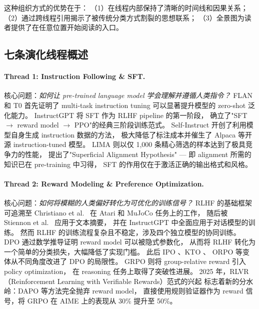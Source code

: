 \noindent
这种组织方式的优势在于：
（1）在线程内部保持了清晰的时间线和因果关系；
（2）通过跨线程引用揭示了被传统分类方式割裂的思想联系；
（3）全景图为读者提供了在任意位置开始阅读的入口。

\subsection{七条演化线程概述}
\label{sec:t0-threads}

\paragraph{Thread 1: Instruction Following \& SFT.}
核心问题：\textit{如何让 pre-trained language model 学会理解并遵循人类指令？}
FLAN \cite{wei2022flan} 和 T0 \cite{sanh2022multitask} 首先证明了
multi-task instruction tuning 可以显著提升模型的 zero-shot 泛化能力。
InstructGPT \cite{ouyang2022instructgpt} 将 SFT 作为 RLHF pipeline 的第一阶段，
确立了"SFT $\rightarrow$ reward model $\rightarrow$ PPO"的经典三阶段训练范式。
Self-Instruct \cite{wang2023selfinstruct} 开创了利用模型自身生成 instruction 数据的方法，
极大降低了标注成本并催生了 Alpaca \cite{taori2023alpaca} 等开源 instruction-tuned 模型。
LIMA \cite{zhou2023lima} 则以仅 1,000 条精心筛选的样本达到了极具竞争力的性能，
提出了"Superficial Alignment Hypothesis" --- 即 alignment 所需的知识已在 pre-training 中习得，
SFT 的作用仅在于激活正确的输出格式和风格。

\paragraph{Thread 2: Reward Modeling \& Preference Optimization.}
核心问题：\textit{如何将模糊的人类偏好转化为可优化的训练信号？}
RLHF 的基础框架可追溯至
Christiano et al.\ \cite{christiano2017rlhf} 在 Atari 和 MuJoCo 任务上的工作，
随后被 Stiennon et al.\ \cite{stiennon2020summarize} 应用于文本摘要，
并在 InstructGPT \cite{ouyang2022instructgpt} 中全面应用于对话模型的训练。
然而 RLHF 的训练流程复杂且不稳定，涉及四个独立模型的协同训练。
DPO \cite{rafailov2023dpo} 通过数学推导证明 reward model 可以被隐式参数化，
从而将 RLHF 转化为一个简单的分类损失，大幅降低了实现门槛。
此后 IPO \cite{azar2023ipo}、KTO \cite{ethayarajh2024kto}、
ORPO \cite{hong2024orpo} 等变体从不同角度改进了 DPO 的局限性。
GRPO \cite{shao2024grpo} 则将 group-relative reward 引入 policy optimization，
在 reasoning 任务上取得了突破性进展。
2025 年，RLVR（Reinforcement Learning with Verifiable Rewards）范式的兴起
标志着新的分水岭：DAPO \cite{yu2025dapo} 等方法完全抛弃 reward model，
直接使用规则验证器作为 reward 信号，将 GRPO 在 AIME 上的表现从 30\% 提升至 50\%。

